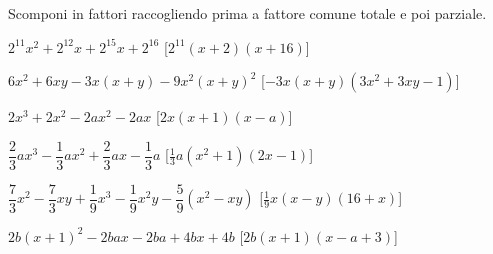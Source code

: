 % 

\begin{esercizio}[\Ast]
\label{ese:div.016}
Scomponi in fattori raccogliendo prima a fattore comune totale e poi parziale.
\begin{enumeratea}
 \item \(2^{11}x^{2}+2^{12}x+2^{15}x+2^{16}\)
  \hfill [\(2^{11}(x+2)(x+16)\)]
 \item \(6x^{2}+6xy-3x(x+y)-9x^{2}(x+y)^{2}\)
  \hfill [\(-3x(x+y)\left(3x^2+3xy-1\right)\)]
 \item \(2x^{3}+2x^{2}-2ax^{2}-2ax\)
  \hfill [\(2x(x+1)(x-a)\)]
 \item \(\dfrac{2}{3}ax^{3}-\dfrac{1}{3}ax^{2}+\dfrac{2}{3}ax-\dfrac{1}{3}a\)
  \hfill [\(\frac{1}{3}a(x^{2}+1)(2x-1)\)]
 \item \(\dfrac{7}{3}x^{2}-\dfrac{7}{3}xy+\dfrac{1}{9}x^{3}-
        \dfrac{1}{9}x^{2}y-\dfrac{5}{9}(x^{2}-xy)\)
  \hfill [\(\frac{1}{9}x(x-y)(16+x)\)]
 \item \(2b(x+1)^{2}-2bax-2ba+4bx+4b\)
  \hfill [\(2b(x+1)(x-a+3)\)]
\end{enumeratea}
\end{esercizio}


